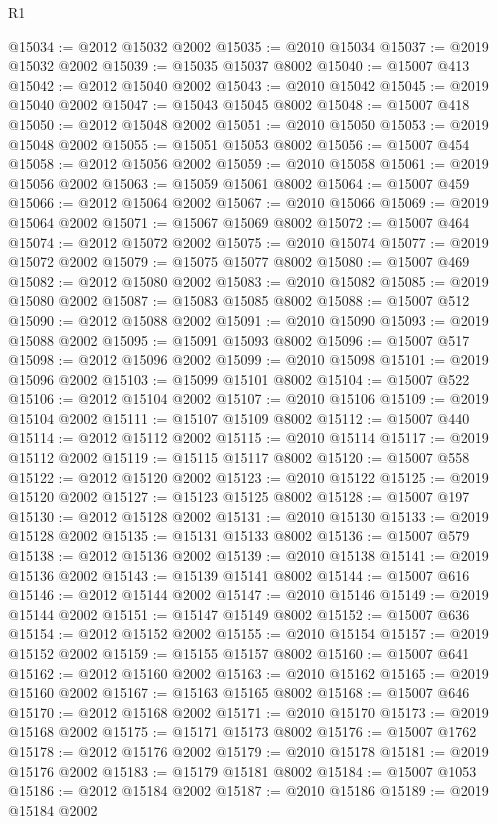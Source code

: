 \begin{lexlean}{R1}
\begin{coremodule}
@15034 := @2012 @15032 @2002
@15035 := @2010 @15034
@15037 := @2019 @15032 @2002
@15039 := @15035 @15037 @8002
@15040 := @15007 @413
@15042 := @2012 @15040 @2002
@15043 := @2010 @15042
@15045 := @2019 @15040 @2002
@15047 := @15043 @15045 @8002
@15048 := @15007 @418
@15050 := @2012 @15048 @2002
@15051 := @2010 @15050
@15053 := @2019 @15048 @2002
@15055 := @15051 @15053 @8002
@15056 := @15007 @454
@15058 := @2012 @15056 @2002
@15059 := @2010 @15058
@15061 := @2019 @15056 @2002
@15063 := @15059 @15061 @8002
@15064 := @15007 @459
@15066 := @2012 @15064 @2002
@15067 := @2010 @15066
@15069 := @2019 @15064 @2002
@15071 := @15067 @15069 @8002
@15072 := @15007 @464
@15074 := @2012 @15072 @2002
@15075 := @2010 @15074
@15077 := @2019 @15072 @2002
@15079 := @15075 @15077 @8002
@15080 := @15007 @469
@15082 := @2012 @15080 @2002
@15083 := @2010 @15082
@15085 := @2019 @15080 @2002
@15087 := @15083 @15085 @8002
@15088 := @15007 @512
@15090 := @2012 @15088 @2002
@15091 := @2010 @15090
@15093 := @2019 @15088 @2002
@15095 := @15091 @15093 @8002
@15096 := @15007 @517
@15098 := @2012 @15096 @2002
@15099 := @2010 @15098
@15101 := @2019 @15096 @2002
@15103 := @15099 @15101 @8002
@15104 := @15007 @522
@15106 := @2012 @15104 @2002
@15107 := @2010 @15106
@15109 := @2019 @15104 @2002
@15111 := @15107 @15109 @8002
@15112 := @15007 @440
@15114 := @2012 @15112 @2002
@15115 := @2010 @15114
@15117 := @2019 @15112 @2002
@15119 := @15115 @15117 @8002
@15120 := @15007 @558
@15122 := @2012 @15120 @2002
@15123 := @2010 @15122
@15125 := @2019 @15120 @2002
@15127 := @15123 @15125 @8002
@15128 := @15007 @197
@15130 := @2012 @15128 @2002
@15131 := @2010 @15130
@15133 := @2019 @15128 @2002
@15135 := @15131 @15133 @8002
@15136 := @15007 @579
@15138 := @2012 @15136 @2002
@15139 := @2010 @15138
@15141 := @2019 @15136 @2002
@15143 := @15139 @15141 @8002
@15144 := @15007 @616
@15146 := @2012 @15144 @2002
@15147 := @2010 @15146
@15149 := @2019 @15144 @2002
@15151 := @15147 @15149 @8002
@15152 := @15007 @636
@15154 := @2012 @15152 @2002
@15155 := @2010 @15154
@15157 := @2019 @15152 @2002
@15159 := @15155 @15157 @8002
@15160 := @15007 @641
@15162 := @2012 @15160 @2002
@15163 := @2010 @15162
@15165 := @2019 @15160 @2002
@15167 := @15163 @15165 @8002
@15168 := @15007 @646
@15170 := @2012 @15168 @2002
@15171 := @2010 @15170
@15173 := @2019 @15168 @2002
@15175 := @15171 @15173 @8002
@15176 := @15007 @1762
@15178 := @2012 @15176 @2002
@15179 := @2010 @15178
@15181 := @2019 @15176 @2002
@15183 := @15179 @15181 @8002
@15184 := @15007 @1053
@15186 := @2012 @15184 @2002
@15187 := @2010 @15186
@15189 := @2019 @15184 @2002

\end{coremodule}
\end{lexlean}

